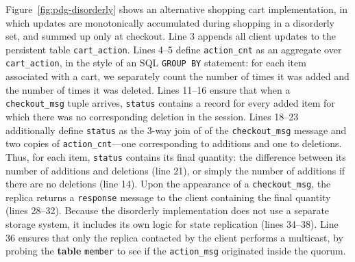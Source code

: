 Figure~\ref{fig:pdg-disorderly} shows an alternative shopping cart implementation, in which
updates are monotonically accumulated during shopping in a disorderly set, and summed up
only at checkout.  Line 3 appends all client updates to the persistent table
\texttt{cart\_action}.  Lines 4--5 define \texttt{action\_cnt} as an aggregate
over \texttt{cart\_action}, in the style of an SQL \texttt{GROUP BY} statement: for each
item associated with a cart, we separately count the number of times it was
added and the number of times it was deleted.   
Lines 11--16 ensure that when a \texttt{checkout\_msg} tuple arrives, \texttt{status} 
contains a record for every added item
for which there was no corresponding deletion in the session.  Lines 18--23 
additionally define \texttt{status} as the 3-way join of of the \texttt{checkout\_msg}
message and two copies of \texttt{action\_cnt}---one corresponding to additions and one to
deletions.
Thus, for each item, \texttt{status} contains its final quantity: the
difference between its number of additions and deletions (line 21), or simply the number
of additions if there are no deletions (line 14). 
Upon the appearance of a \texttt{checkout\_msg}, the
replica returns a \texttt{response} message to the client containing the
final quantity (lines 28--32).  
Because the disorderly implementation does not use a separate
storage system, it includes its own logic for state replication (lines 34--38).
Line 36 ensures that only the replica contacted by the client performs a multicast,
by probing the \textbf{table} \texttt{member} to see if the \texttt{action\_msg} 
originated inside the quorum.


